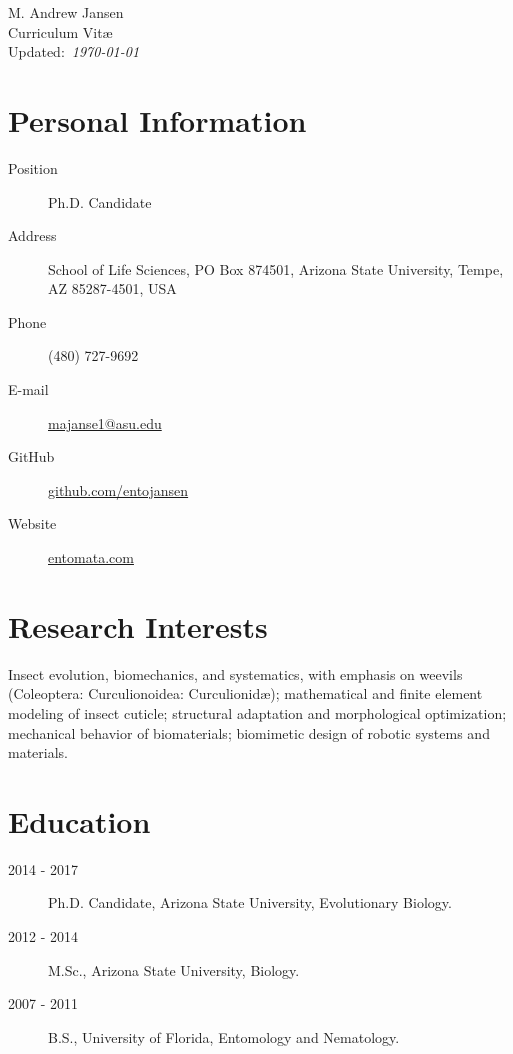 \documentclass[12pt,a4paper]{article}
\begin{document}
\begin{center}
	{\LARGE M. Andrew Jansen}\\
	\medskip
	{\Large Curriculum Vit\ae}\\
	Updated:~\textit{\today}
\end{center}

\section*{Personal Information}
	\begin{description}
		\item [Position] \tabto*{2cm} Ph.D. Candidate
		\item [Address] \tabto*{2cm} School of Life Sciences, PO Box 874501, Arizona State University, Tempe, AZ 85287-4501, USA
		\item [Phone] \tabto*{2cm} (480) 727-9692
		\item [E-mail] \tabto*{2cm} \href{mailto:majanse1@asu.edu}{majanse1@asu.edu}
		\item [GitHub] \tabto*{2cm} \href{https://github.com/entojansen}{github.com/entojansen}
		\item [Website] \tabto*{2cm} \href{https://entomata.com}{entomata.com}
	\end{description}

\section*{Research Interests}
	Insect evolution, biomechanics, and systematics, with emphasis on weevils (Coleoptera: Curculionoidea: Curculionid\ae);
	mathematical and finite element modeling of insect cuticle;
	structural adaptation and morphological optimization;
	mechanical behavior of biomaterials;
	biomimetic design of robotic systems and materials.

\section*{Education}
	\begin{description}
		\item [2014 - 2017] Ph.D. Candidate, Arizona State University, Evolutionary Biology.
		\item [2012 - 2014] M.Sc., Arizona State University, Biology.
		\item [2007 - 2011] B.S., University of Florida, Entomology and Nematology.
	\end{description}
\end{document}
